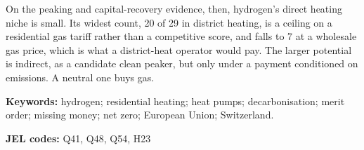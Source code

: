 On the peaking and capital-recovery evidence, then, hydrogen's direct heating niche is
small. Its widest count, 20 of 29 in district heating, is a ceiling on a residential gas
tariff rather than a competitive score, and falls to 7 at a wholesale gas price, which is
what a district-heat operator would pay. The larger potential is indirect, as a candidate
clean peaker, but only under a payment conditioned on emissions. A neutral one buys gas.

\medskip
\noindent\textbf{Keywords:} hydrogen; residential heating; heat pumps;
decarbonisation; merit order; missing money; net zero; European Union;
Switzerland.

\smallskip
\noindent\textbf{JEL codes:} Q41, Q48, Q54, H23
